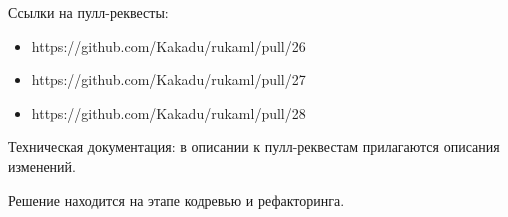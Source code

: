 \documentclass[a4paper]{article}
\begin{document}
Ссылки на пулл-реквесты:
\begin{itemize}
    \item https://github.com/Kakadu/rukaml/pull/26
    \item https://github.com/Kakadu/rukaml/pull/27
    \item https://github.com/Kakadu/rukaml/pull/28
\end{itemize}

Техническая документация: в описании к пулл-реквестам прилагаются описания изменений.

Решение находится на этапе кодревью и рефакторинга.
\end{document}
